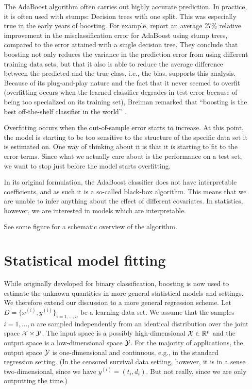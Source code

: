 The AdaBoost algorithm often carries out highly accurate prediction. In practice, it is often used with stumps: Decision trees with one split. This was especially true in the early years of boosting. For example, \citet{bauer-kohavi} report an average 27\% relative improvement in the misclassification error for AdaBoost using stump trees, compared to the error attained with a single decision tree. They conclude that boosting not only reduces the variance in the prediction error from using different training data sets, but that it also is able to reduce the average difference between the predicted and the true class, i.e., the bias. \citet{breiman1998} supports this analysis. Because of its plug-and-play nature and the fact that it never seemed to overfit (overfitting occurs when the learned classifier degrades in test error because of being too specialized on its training set), Breiman remarked that ``boosting is the best off-the-shelf classifier in the world'' \citep{ESL}.

Overfitting occurs when the out-of-sample error starts to increase. At this point, the model is starting to be too sensitive to the structure of the specific data set it is estimated on. One way of thinking about it is that it is starting to fit to the error terms. Since what we actually care about is the performance on a test set, we want to stop just before the model starts overfitting.

In its original formulation, the AdaBoost classifier does not have interpretable coefficients, and as such it is a so-called black-box algorithm. This means that we are unable to infer anything about the effect of different covariates. In statistics, however, we are interested in models which are interpretable.

See some figure for a schematic overview of the algorithm.

\section{Statistical model fitting}
While originally developed for binary classification, boosting is now used to estimate the unknown quantities in more general statistical models and settings. We therefore extend our discussion to a more general regression scheme. Let $D=\{x^{(i)},y^{(i)}\}_{i=1,\ldots,n}$ be a learning data set. We assume that the samples $i=1,\ldots,n$ are sampled independently from an identical distribution over the joint space $\mathcal{X}\times\mathcal{Y}$. The input space is a possibly high-dimensional $\mathcal{X}\in\mathbb{R}^p$ and the output space is a low-dimensional space $\mathcal{Y}$. For the majority of applications, the output space $\mathcal{Y}$ is one-dimensional and continuous, e.g., in the standard regression setting. (In the censored survival data setting, however, it is in a sense two-dimensional, since we have $y^{(i)}=(t_i,d_i)$. But not really, since we are only outputting the time.)

